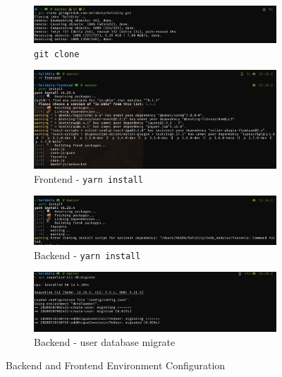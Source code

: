 \documentclass[12pt]{article}
\renewcommand{\_}{\kern-1.5pt\textunderscore\kern-1.5pt}
\begin{document}
\begin{figure}[H]
	\centering
	\begin{subfigure}[b]{.45\textwidth}
		\centering
		\includegraphics[width=\textwidth]{graphs/01. git_clone}
		\caption{\texttt{git clone}}
	\end{subfigure}
	\begin{subfigure}[b]{.45\textwidth}
		\centering
		\includegraphics[width=\textwidth]{graphs/04. yarn_install_frontend}
		\caption{Frontend - \texttt{yarn install}}
	\end{subfigure}
	\hspace{1em}
	\begin{subfigure}[b]{.45\textwidth}
		\centering
		\includegraphics[width=\textwidth]{graphs/02. yarn_install_backend}
		\caption{Backend - \texttt{yarn install}}

	\end{subfigure}
	\begin{subfigure}[b]{.45\textwidth}
		\centering
		\includegraphics[width=\textwidth]{graphs/03. user_db_migrate}
		\caption{Backend - user database migrate}
	\end{subfigure}
	\caption{Backend and Frontend Environment Configuration}
\end{figure}
\end{document}
